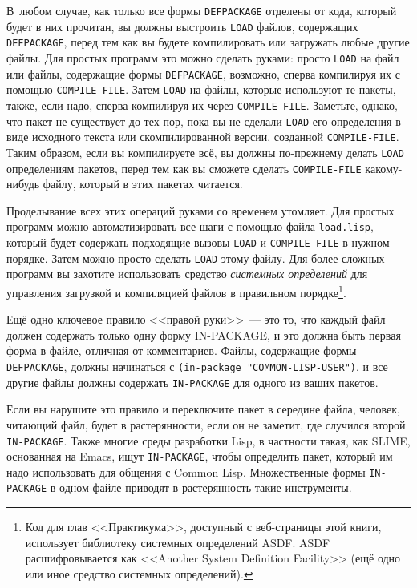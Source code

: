 В~любом случае, как только все формы \lstinline{DEFPACKAGE} отделены от кода, который будет в
них прочитан, вы должны выстроить \lstinline{LOAD} файлов, содержащих \lstinline{DEFPACKAGE}, перед
тем как вы будете компилировать или загружать любые другие файлы. Для простых программ
это можно сделать руками: просто \lstinline{LOAD} на файл или файлы, содержащие формы
\lstinline{DEFPACKAGE}, возможно, сперва компилируя их с помощью \lstinline{COMPILE-FILE}. Затем
\lstinline{LOAD} на файлы, которые используют те пакеты, также, если надо, сперва компилируя их
через \lstinline{COMPILE-FILE}. Заметьте, однако, что пакет не существует до тех пор, пока вы
не сделали \lstinline{LOAD} его определения в виде исходного текста или скомпилированной
версии, созданной \lstinline{COMPILE-FILE}. Таким образом, если вы компилируете всё, вы должны
по-прежнему делать \lstinline{LOAD} определениям пакетов, перед тем как вы сможете сделать
\lstinline{COMPILE-FILE} какому-нибудь файлу, который в этих пакетах читается.

Проделывание всех этих операций руками со временем утомляет.  Для простых программ можно
автоматизировать все шаги с помощью файла \lstinline{load.lisp}, который будет содержать
подходящие вызовы \lstinline{LOAD} и \lstinline{COMPILE-FILE} в нужном порядке. Затем можно прос\-то
сделать \lstinline{LOAD} этому файлу. Для более сложных программ вы захотите использовать
средство \textit{системных определений} для управления загрузкой и компиляцией файлов в
правильном порядке\footnote{Код для глав <<Практикума>>, доступный с веб-страницы этой
  книги, использует библиотеку системных определений ASDF. ASDF расшифровывается как
  <<Another System Definition Facility>> (ещё одно или иное средство системных определений).}.

Ещё одно ключевое правило <<правой руки>>~--- это то, что каждый файл должен содержать только
одну форму IN-PACKAGE, и это должна быть первая форма в файле, отличная от комментариев.
Файлы, содержащие формы \lstinline{DEFPACKAGE}, должны начинаться с 
\lstinline{(in-package "COMMON-LISP-USER")}, и все другие файлы должны содержать \lstinline{IN-PACKAGE} для одного из
ваших пакетов.

Если вы нарушите это правило и переключите пакет в середине файла, человек, читающий файл,
будет в растерянности, если он не заметит, где случился второй \lstinline{IN-PACKAGE}. Также
многие среды разработки Lisp, в частности такая, как SLIME, основанная на Emacs, ищут
\lstinline{IN-PACKAGE}, чтобы определить пакет, который им надо использовать для общения с
Common Lisp. Множественные формы \lstinline{IN-PACKAGE} в одном файле приводят в растерянность
такие инструменты.

